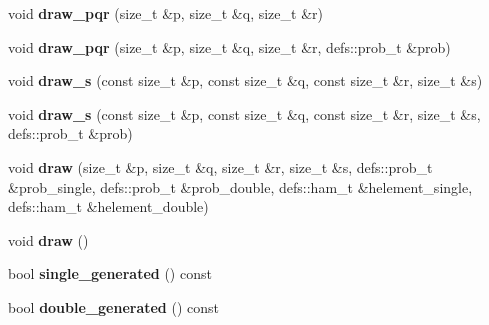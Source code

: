 \begin{DoxyCompactItemize}
\item 
void {\bfseries draw\+\_\+pqr} (size\+\_\+t \&p, size\+\_\+t \&q, size\+\_\+t \&r)\hypertarget{classDeterminantSampler_a9764cc8221fb895caf9014c07857b5eb}{}\label{classDeterminantSampler_a9764cc8221fb895caf9014c07857b5eb}

\item 
void {\bfseries draw\+\_\+pqr} (size\+\_\+t \&p, size\+\_\+t \&q, size\+\_\+t \&r, defs\+::prob\+\_\+t \&prob)\hypertarget{classDeterminantSampler_a479a10cf7c973805e1a70ac5c09654dd}{}\label{classDeterminantSampler_a479a10cf7c973805e1a70ac5c09654dd}

\item 
void {\bfseries draw\+\_\+s} (const size\+\_\+t \&p, const size\+\_\+t \&q, const size\+\_\+t \&r, size\+\_\+t \&s)\hypertarget{classDeterminantSampler_a6c7b1d4a7f2acf36ec518346172a5dc3}{}\label{classDeterminantSampler_a6c7b1d4a7f2acf36ec518346172a5dc3}

\item 
void {\bfseries draw\+\_\+s} (const size\+\_\+t \&p, const size\+\_\+t \&q, const size\+\_\+t \&r, size\+\_\+t \&s, defs\+::prob\+\_\+t \&prob)\hypertarget{classDeterminantSampler_af71dfd0ce319f32ff71e5595164cbfc6}{}\label{classDeterminantSampler_af71dfd0ce319f32ff71e5595164cbfc6}

\item 
void {\bfseries draw} (size\+\_\+t \&p, size\+\_\+t \&q, size\+\_\+t \&r, size\+\_\+t \&s, defs\+::prob\+\_\+t \&prob\+\_\+single, defs\+::prob\+\_\+t \&prob\+\_\+double, defs\+::ham\+\_\+t \&helement\+\_\+single, defs\+::ham\+\_\+t \&helement\+\_\+double)\hypertarget{classDeterminantSampler_a0ba6e15b20e2412fb07d0414e17dddfe}{}\label{classDeterminantSampler_a0ba6e15b20e2412fb07d0414e17dddfe}

\item 
void {\bfseries draw} ()\hypertarget{classDeterminantSampler_afda44a408c15e263eecb24e81350c29c}{}\label{classDeterminantSampler_afda44a408c15e263eecb24e81350c29c}

\item 
bool {\bfseries single\+\_\+generated} () const \hypertarget{classDeterminantSampler_a00f9c10c39c279196ecf3fa0a292ba05}{}\label{classDeterminantSampler_a00f9c10c39c279196ecf3fa0a292ba05}

\item 
bool {\bfseries double\+\_\+generated} () const \hypertarget{classDeterminantSampler_af078b8fe1e6d20d9c2d90dba26014746}{}\label{classDeterminantSampler_af078b8fe1e6d20d9c2d90dba26014746}


\end{DoxyCompactItemize}
